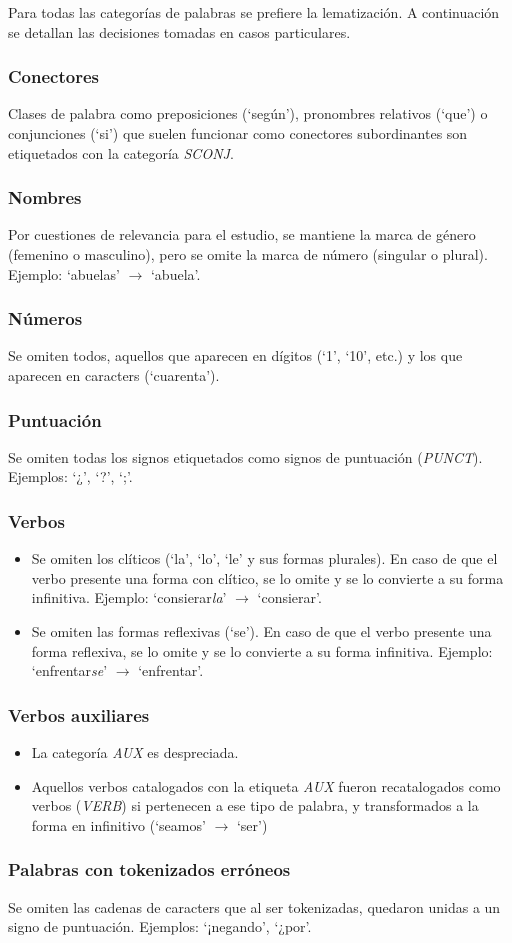 Para todas las categorías de palabras se prefiere la lematización. A continuación
se detallan las decisiones tomadas en casos particulares.

\subsubsection{Conectores}
Clases de palabra como preposiciones (`según'), pronombres relativos (`que') o
conjunciones (`si') que suelen funcionar como conectores subordinantes son
etiquetados con la categoría \textit{SCONJ}.

\subsubsection{Nombres}
Por cuestiones de relevancia para el estudio, se mantiene la marca de género (femenino
o masculino), pero se omite la marca de número (singular o plural). Ejemplo: `abuelas'
$\rightarrow$ `abuela'.

\subsubsection{Números}
Se omiten todos, aquellos que aparecen en dígitos (`1', `10', etc.) y los que aparecen
en caracters (`cuarenta').

\subsubsection{Puntuación}
Se omiten todas los signos etiquetados como signos de puntuación (\textit{PUNCT}).
Ejemplos: `¿', `?', `;'.

\subsubsection{Verbos}
\begin{itemize}
    \item Se omiten los clíticos (`la', `lo', `le' y sus formas plurales). En caso de
    que el verbo presente una forma con clítico, se lo omite y se lo convierte a su
    forma infinitiva. Ejemplo: `consierar\textit{la}' $\rightarrow$ `consierar'.
    \item Se omiten las formas reflexivas (`se'). En caso de que el verbo presente
    una forma reflexiva, se lo omite y se lo convierte a su forma infinitiva.
    Ejemplo: `enfrentar\textit{se}' $\rightarrow$ `enfrentar'.
\end{itemize}

\subsubsection{Verbos auxiliares}
\begin{itemize}
    \item La categoría \textit{AUX} es despreciada.
    \item Aquellos verbos catalogados con la etiqueta \textit{AUX} fueron
    recatalogados como verbos (\textit{VERB}) si pertenecen a ese tipo de
    palabra, y transformados a la forma en infinitivo (`seamos' $\rightarrow$ `ser')
\end{itemize}

\subsubsection{Palabras con tokenizados erróneos}
Se omiten las cadenas de caracters que al ser tokenizadas, quedaron unidas a un
signo de puntuación. Ejemplos: `¡negando', `¿por'.
